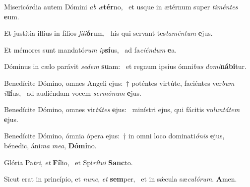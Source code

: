 \item Misericórdia autem Dómini \textit{ab} \textit{æ}\textbf{tér}no,~\psstar{} et usque in ætérnum super \textit{timéntes} \textbf{e}um.
\item Et justítia illíus in fílios \textit{fili}\textbf{ó}rum,~\psstar{} his qui servant tes\textit{taméntum} \textbf{e}jus.
\item Et mémores sunt mandató\textit{rum} \textit{ip}\textbf{sí}us,~\psstar{} ad fa\textit{ciéndum} \textbf{e}a.
\item Dóminus in cælo parávit \textit{sedem} \textbf{su}am:~\psstar{} et regnum ipsíus ómni\textit{bus} \textit{domi}\textbf{ná}\textbf{bi}tur.
\item Benedícite Dómino, omnes Angeli ejus:~† poténtes virtúte, faciéntes ver\textit{bum} \textit{il}\textbf{lí}us,~\psstar{} ad audiéndam vocem \textit{sermónum} \textbf{e}jus.
\item Benedícite Dómino, omnes vir\textit{tútes} \textbf{e}jus:~\psstar{} minístri ejus, qui fácitis vo\textit{luntátem} \textbf{e}jus.
\item Benedícite Dómino, ómnia ópera ejus:~† in omni loco dominati\textit{ónis} \textbf{e}jus,~\psstar{} bénedic, áni\textit{ma} \textit{mea}, \textbf{Dó}\textbf{mi}no.
\item Glória Pa\textit{tri}, \textit{et} \textbf{Fí}lio,~\psstar{} et Spi\textit{rítui} \textbf{Sanc}to.
\item Sicut erat in princípio, et \textit{nunc}, \textit{et} \textbf{sem}per,~\psstar{} et in sǽcula sæ\textit{culórum}. \textbf{A}men.
